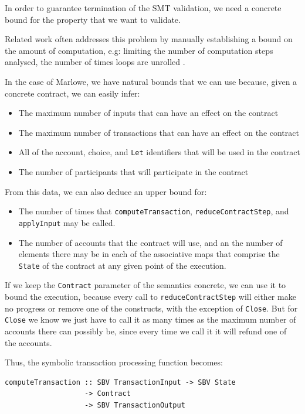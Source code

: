 \documentclass[english,runningheads]{llncs}
\begin{document}
In order to guarantee termination of the SMT validation, we need a
concrete bound for the property that we want to validate.

Related work often addresses this problem by manually establishing
a bound on the amount of computation, e.g: limiting the number of
computation steps analysed, the number of times loops are unrolled
\cite{clarke2004tool,gulwani2008program,jackson2000finding}.

In the case of Marlowe, we have natural bounds that we can use because,
given a concrete contract, we can easily infer:
\begin{itemize}
\item The maximum number of inputs that can have an effect on the contract
\item The maximum number of transactions that can have an effect on the
contract
\item All of the account, choice, and \texttt{Let} identifiers that will
be used in the contract
\item The number of participants that will participate in the contract
\end{itemize}
From this data, we can also deduce an upper bound for:
\begin{itemize}
\item The number of times that
\texttt{computeTransaction}, \texttt{reduceContractStep}, and \texttt{applyInput} may
be called.
\item The number of accounts that the contract will use, and an
the number of elements there may be in each of the associative maps
that comprise the \texttt{State} of the contract at any given point
of the execution.
\end{itemize}
If we keep the \texttt{Contract} parameter of the semantics concrete,
we can use it to bound the execution, because every call to \texttt{reduceContractStep}
will either make no progress or remove one of the constructs, with
the exception of \texttt{Close}. But for \texttt{Close} we know we
just have to call it as many times as the maximum number of accounts
there can possibly be, since every time we call it it will refund
one of the accounts.

Thus, the symbolic transaction processing function becomes:

\begin{verbatim}
computeTransaction :: SBV TransactionInput -> SBV State
                   -> Contract
                   -> SBV TransactionOutput
\end{verbatim}
\end{document}
